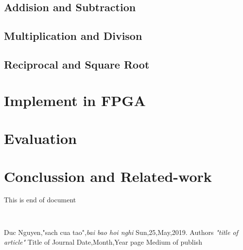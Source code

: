 \documentclass[13pt,a4paper,vietnamese]{report}
\begin{document}
\section{Addision and Subtraction}
\section{Multiplication and Divison}
\section{Reciprocal and Square Root}

\chapter{Implement in FPGA}

\chapter{Evaluation}

\chapter{Conclussion and Related-work}
This is end of document

\cite{name1}\\

\pagebreak
\begin{thebibliography}{}
Duc Nguyen,"sach cua tao",\textit{bai bao hoi nghi} Sun,25,May,2019.
Authors
\textit{"title of article"}
Title of Journal
Date,Month,Year
page
Medium of publish
\end{thebibliography}
\end{document}

